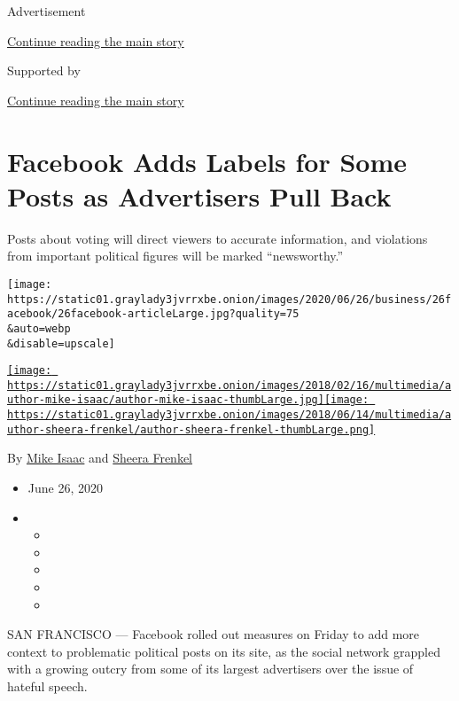 Advertisement

\protect\hyperlink{after-top}{Continue reading the main story}

Supported by

\protect\hyperlink{after-sponsor}{Continue reading the main story}

\hypertarget{facebook-adds-labels-for-some-posts-as-advertisers-pull-back}{%
\section{Facebook Adds Labels for Some Posts as Advertisers Pull
Back}\label{facebook-adds-labels-for-some-posts-as-advertisers-pull-back}}

Posts about voting will direct viewers to accurate information, and
violations from important political figures will be marked
``newsworthy.''

\texttt{[image: https://static01.graylady3jvrrxbe.onion/images/2020/06/26/business/26facebook/26facebook-articleLarge.jpg?quality=75\\\&auto=webp\\\&disable=upscale]}

\href{https://www.nytimes3xbfgragh.onion/by/mike-isaac}{\texttt{[image: https://static01.graylady3jvrrxbe.onion/images/2018/02/16/multimedia/author-mike-isaac/author-mike-isaac-thumbLarge.jpg]}}\href{https://www.nytimes3xbfgragh.onion/by/sheera-frenkel}{\texttt{[image: https://static01.graylady3jvrrxbe.onion/images/2018/06/14/multimedia/author-sheera-frenkel/author-sheera-frenkel-thumbLarge.png]}}

By \href{https://www.nytimes3xbfgragh.onion/by/mike-isaac}{Mike Isaac}
and \href{https://www.nytimes3xbfgragh.onion/by/sheera-frenkel}{Sheera
Frenkel}

\begin{itemize}
\item
  June 26, 2020
\item
  \begin{itemize}
  \item
  \item
  \item
  \item
  \item
  \end{itemize}
\end{itemize}

SAN FRANCISCO --- Facebook rolled out measures on Friday to add more
context to problematic political posts on its site, as the social
network grappled with a growing outcry from some of its largest
advertisers over the issue of hateful speech.


